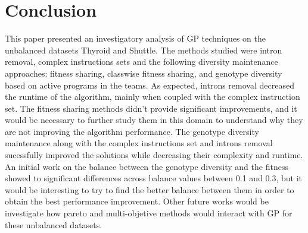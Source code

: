 \documentclass[journal]{IEEEtran}
\begin{document}
\section{Conclusion}
This paper presented an investigatory analysis of GP techniques on the unbalanced datasets Thyroid and Shuttle. The methods studied were intron removal, complex instructions sets and the following diversity maintenance approaches: fitness sharing, classwise fitness sharing, and genotype diversity based on active programs in the teams. As expected, introns removal decreased the runtime of the algorithm, mainly when coupled with the complex instruction set. The fitness sharing methods didn't provide significant improvements, and it would be necessary to further study them in this domain to understand why they are not improving the algorithm performance. The genotype diversity maintenance along with the complex instructions set and introns removal sucessfully improved the solutions while decreasing their complexity and runtime. An initial work on the balance between the genotype diversity and the fitness showed to significant differences across balance values between 0.1 and 0.3, but it would be interesting to try to find the better balance between them in order to obtain the best performance improvement. Other future works would be investigate how pareto and multi-objetive methods would interact with GP for these unbalanced datasets.

%
%

\end{document}
